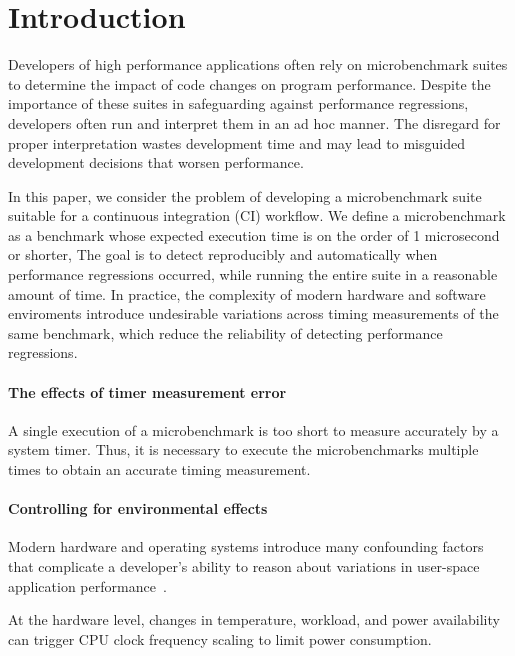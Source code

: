 \documentclass[conference]{IEEEtran}
\begin{document}
\IEEEpeerreviewmaketitle


\label{sec:intro}
\section{Introduction}

Developers of high performance applications often rely on microbenchmark suites to determine
the impact of code changes on program performance. Despite the importance of these suites in
safeguarding against performance regressions, developers often run and interpret them in an
ad hoc manner. The disregard for proper interpretation wastes development time and may
lead to misguided development decisions that worsen performance.

In this paper, we consider the problem of developing a microbenchmark suite
suitable for a continuous integration (CI) workflow. We define a microbenchmark
as a benchmark whose expected execution time is on the order of 1 microsecond
or shorter,
The goal is to detect reproducibly and automatically when performance regressions occurred,
while running the entire suite in a reasonable amount of time.
In practice, the complexity of modern hardware and software enviroments introduce
undesirable variations across timing measurements of the same benchmark, which
reduce the reliability of detecting performance regressions.


\paragraph{The effects of timer measurement error}
A single execution of a microbenchmark is too short to measure
accurately by a system timer. Thus, it is necessary to execute the
microbenchmarks multiple times to obtain an accurate timing measurement.


\paragraph{Controlling for environmental effects}
Modern hardware and operating systems introduce many confounding factors that
complicate a developer's ability to reason about variations in user-space
application performance~\cite{HP5e}.

At the hardware level, changes in temperature, workload, and power availability
can trigger CPU clock frequency scaling to limit power consumption.
\end{document}
